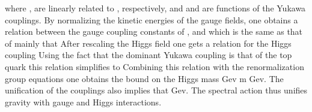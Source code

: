 \documentclass[a4paper,12pt]{article}
\begin{document}
where \coordHE{}  \coordHE{}, \coordHE{} are linearly related to \coordHE{}  \coordHE{}, \coordHE{}
respectively, and \coordHE{} and \coordHE{} are functions of the Yukawa couplings. By
normalizing the kinetic energies of the gauge fields, one obtains a relation
between the gauge coupling constants of \coordHE{}, \coordHE{} and \coordHE{} which is
the same as that of \coordHE{} mainly that \coordHE{} After rescaling the Higgs field one gets a relation for the Higgs
coupling \coordHE{} Using the fact that the
dominant Yukawa coupling is that of the top quark this relation simplifies to
\coordHE{} Combining this relation with the renormalization group
equations one obtains the bound on the Higgs mass \coordHE{} Gev \myHighlight{$<$}\coordHE{} m\coordHE{}  \coordHE{} Gev. The unification of the couplings also implies that \coordHE{} Gev. The spectral action thus unifies gravity with gauge and
Higgs interactions.
\end{document}

